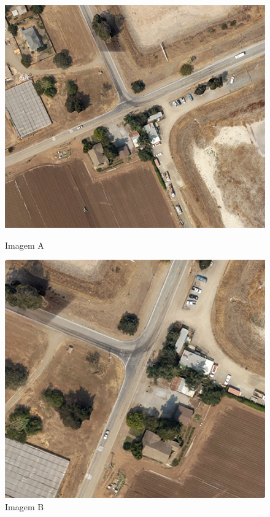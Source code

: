 \documentclass{article}
\begin{document}
\begin{figure}[!htb]
  \begin{minipage}{0.48\textwidth}
    \centering
    \includegraphics[width=.99\linewidth]{images/foto4A.jpg}
    \caption{Imagem A}\label{Fig:imagemA}
  \end{minipage}\hfill
  \begin{minipage}{0.48\textwidth}
    \centering
    \includegraphics[width=.99\linewidth]{images/foto4B.jpg}
    \caption{Imagem B}\label{Fig:imagemB}
  \end{minipage}
\end{figure}
\end{document}
